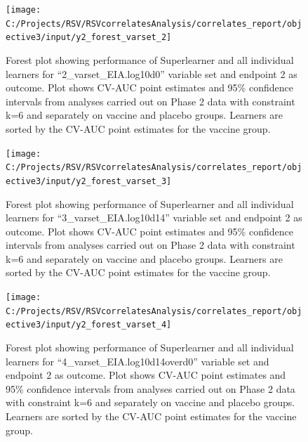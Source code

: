 \documentclass[11pt]{article}
\begin{document}
\begin{figure}[H]

{\centering \texttt{[image: C:/Projects/RSV/RSVcorrelatesAnalysis/correlates\_report/objective3/input/y2\_forest\_varset\_2]} 

}

\caption[Forest plot for ``2\_varset\_EIA.log10d0'' variable set, endpoint 2.]{Forest plot showing performance of Superlearner and all individual learners for ``2\_varset\_EIA.log10d0'' variable set and endpoint 2 as outcome. Plot shows CV-AUC point estimates and 95\% confidence intervals from analyses carried out on Phase 2 data with constraint k=6 and separately on vaccine and placebo groups. Learners are sorted by the CV-AUC point estimates for the vaccine group.}\label{fig:y2-forest-varset-2}
\end{figure}

\begin{figure}[H]

{\centering \texttt{[image: C:/Projects/RSV/RSVcorrelatesAnalysis/correlates\_report/objective3/input/y2\_forest\_varset\_3]} 

}

\caption[Forest plot for ``3\_varset\_EIA.log10d14'' variable set, endpoint 2.]{Forest plot showing performance of Superlearner and all individual learners for ``3\_varset\_EIA.log10d14'' variable set and endpoint 2 as outcome. Plot shows CV-AUC point estimates and 95\% confidence intervals from analyses carried out on Phase 2 data with constraint k=6 and separately on vaccine and placebo groups. Learners are sorted by the CV-AUC point estimates for the vaccine group.}\label{fig:y2-forest-varset-3}
\end{figure}

\begin{figure}[H]

{\centering \texttt{[image: C:/Projects/RSV/RSVcorrelatesAnalysis/correlates\_report/objective3/input/y2\_forest\_varset\_4]} 

}

\caption[Forest plot for ``4\_varset\_EIA.log10d14overd0'' variable set, endpoint 2.]{Forest plot showing performance of Superlearner and all individual learners for ``4\_varset\_EIA.log10d14overd0'' variable set and endpoint 2 as outcome. Plot shows CV-AUC point estimates and 95\% confidence intervals from analyses carried out on Phase 2 data with constraint k=6 and separately on vaccine and placebo groups. Learners are sorted by the CV-AUC point estimates for the vaccine group.}\label{fig:y2-forest-varset-4}
\end{figure}
\end{document}
